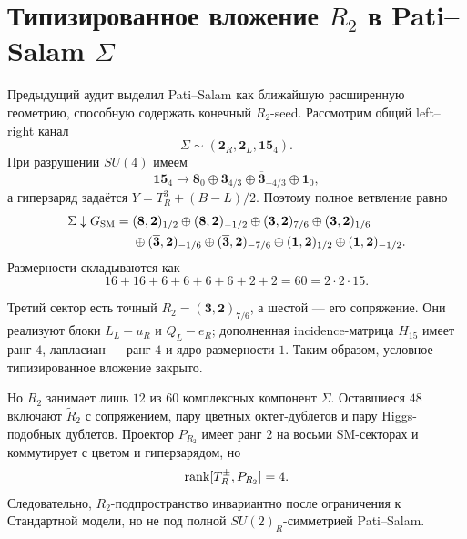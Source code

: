 \chapter{Типизированное вложение \texorpdfstring{$R_2$}{R2} в
Pati--Salam \texorpdfstring{$\Sigma$}{Sigma}}
\label{ch:v10-h15-r2-pati-salam-sigma-embedding}

Предыдущий аудит выделил Pati--Salam как ближайшую расширенную геометрию,
способную содержать конечный $R_2$-seed. Рассмотрим общий left--right канал
\begin{equation}
 \Sigma\sim(\mathbf2_R,\mathbf2_L,\mathbf{15}_4).
\end{equation}
При разрушении $SU(4)$ имеем
\begin{equation}
 \mathbf{15}_4\longrightarrow
 \mathbf8_0\oplus\mathbf3_{4/3}\oplus
 \overline{\mathbf3}_{-4/3}\oplus\mathbf1_0,
\end{equation}
а гиперзаряд задаётся $Y=T_R^3+(B-L)/2$. Поэтому полное ветвление равно
\begin{align}
 \Sigma\downarrow G_{\rm SM}={}&
 (\mathbf8,\mathbf2)_{1/2}\oplus(\mathbf8,\mathbf2)_{-1/2}
 \oplus(\mathbf3,\mathbf2)_{7/6}\oplus(\mathbf3,\mathbf2)_{1/6}\nonumber\\
 &\oplus(\overline{\mathbf3},\mathbf2)_{-1/6}
 \oplus(\overline{\mathbf3},\mathbf2)_{-7/6}
 \oplus(\mathbf1,\mathbf2)_{1/2}\oplus(\mathbf1,\mathbf2)_{-1/2}.
\end{align}
Размерности складываются как
\begin{equation}
 16+16+6+6+6+6+2+2=60=2\cdot2\cdot15.
\end{equation}

Третий сектор есть точный $R_2=(\mathbf3,\mathbf2)_{7/6}$, а шестой ---
его сопряжение. Они реализуют блоки $L_L-u_R$ и $Q_L-e_R$; дополненная
incidence-матрица $H_{15}$ имеет ранг $4$, лапласиан --- ранг $4$ и ядро
размерности $1$. Таким образом, условное типизированное вложение закрыто.

Но $R_2$ занимает лишь $12$ из $60$ комплексных компонент $\Sigma$.
Оставшиеся $48$ включают $\widetilde R_2$ с сопряжением, пару цветных
октет-дублетов и пару Higgs-подобных дублетов. Проектор $P_{R_2}$ имеет
ранг $2$ на восьми SM-секторах и коммутирует с цветом и гиперзарядом, но
\begin{equation}
 \operatorname{rank}[T_R^\pm,P_{R_2}]=4.
\end{equation}
Следовательно, $R_2$-подпространство инвариантно после ограничения к
Стандартной модели, но не под полной $SU(2)_R$-симметрией Pati--Salam.

